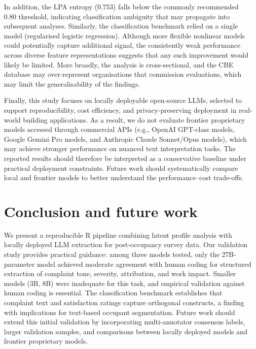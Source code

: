 \documentclass[sigconf]{acmart}
\begin{document}
In addition, the LPA entropy (0.753) falls below the commonly recommended 0.80 threshold, indicating classification ambiguity that may propagate into subsequent analyses. Similarly, the classification benchmark relied on a single model (regularised logistic regression). Although more flexible nonlinear models could potentially capture additional signal, the consistently weak performance across diverse feature representations suggests that any such improvement would likely be limited. More broadly, the analysis is cross-sectional, and the CBE database may over-represent organisations that commission evaluations, which may limit the generalisability of the findings. 

\begin{sloppypar}
Finally, this study focuses on locally deployable open-source LLMs, selected to support reproducibility, cost efficiency, and privacy-preserving deployment in real-world building applications. As a result, we do not evaluate frontier proprietary models accessed through commercial APIs (e.g., OpenAI GPT-class models, Google Gemini Pro models, and Anthropic Claude Sonnet/Opus models), which may achieve stronger performance on nuanced text interpretation tasks. The reported results should therefore be interpreted as a conservative baseline under practical deployment constraints. Future work should systematically compare local and frontier models to better understand the performance–cost trade-offs.
\end{sloppypar}

\section{Conclusion and future work}
We present a reproducible R pipeline combining latent profile analysis with locally deployed LLM extraction for post-occupancy survey data. Our validation study provides practical guidance: among three models tested, only the 27B-parameter model achieved moderate agreement with human coding for structured extraction of complaint tone, severity, attribution, and work impact. Smaller models (3B, 8B) were inadequate for this task, and empirical validation against human coding is essential. The classification benchmark establishes that complaint text and satisfaction ratings capture orthogonal constructs, a finding with implications for text-based occupant segmentation. Future work should extend this initial validation by incorporating multi-annotator consensus labels, larger validation samples, and comparisons between locally deployed models and frontier proprietary models.
\end{document}
